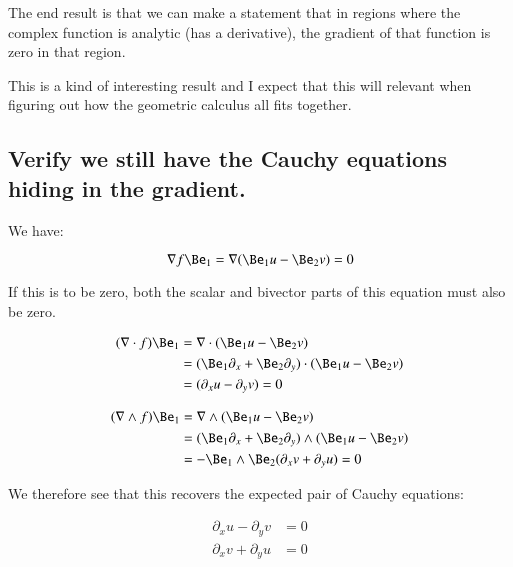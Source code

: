 The end result is that we can make a statement that
in regions where the complex function is analytic (has a derivative), the gradient of that function is zero in that region.

This is a kind of interesting result and I expect that this will relevant when figuring out how the geometric calculus
all fits together.

\subsection{Verify we still have the Cauchy equations hiding in the gradient. }

We have:

\begin{equation*}
\grad f \Be_1 = \grad ( \Be_1 u - \Be_2 v) = 0
\end{equation*}

If this is to be zero, both the scalar and bivector parts of this equation must also be zero.

\begin{align*}
(\grad \cdot f) \Be_1
&= \grad \cdot ( \Be_1 u - \Be_2 v) \\
&= (\Be_1 \partial_x + \Be_2 \partial_y) \cdot ( \Be_1 u - \Be_2 v) \\
&= (\partial_x u - \partial_y v) = 0
\end{align*}

\begin{align*}
(\grad \wedge f) \Be_1
&= \grad \wedge ( \Be_1 u - \Be_2 v) \\
&= (\Be_1 \partial_x + \Be_2 \partial_y) \wedge ( \Be_1 u - \Be_2 v) \\
&= -\Be_1 \wedge \Be_2 (\partial_x v + \partial_y u) = 0
\end{align*}

We therefore see that this recovers the expected pair of Cauchy equations:

\begin{align*}
\partial_x u - \partial_y v &= 0 \\
\partial_x v + \partial_y u &= 0
\end{align*}
